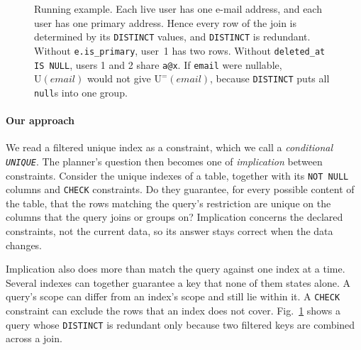 \documentclass[conference]{IEEEtran}
\theoremstyle{definition}
\newcommand{\sql}[1]{\texttt{#1}}
\newcommand{\nul}{\texttt{null}}
\newcommand{\U}[1]{\mathrm{U}(#1)}
\newcommand{\Ueq}[1]{\mathrm{U}^{=}(#1)}
\begin{document}
\begin{figure}[t]
\smallskip
{}
\caption{Running example. Each live user has one e-mail address, and each user has one primary address. Hence every
row of the join is determined by its \sql{DISTINCT} values, and \sql{DISTINCT} is redundant. Without \sql{e.is\_primary},
user~1 has two rows. Without \sql{deleted\_at IS NULL}, users 1 and 2 share \sql{a@x}. If \sql{email} were nullable,
$\U{\mathit{email}}$ would not give $\Ueq{\mathit{email}}$, because \sql{DISTINCT} puts all \nul s into one group.}
\label{fig:example}
\end{figure}

\paragraph*{Our approach} We read a filtered unique index as a constraint, which we call a \emph{conditional
\sql{UNIQUE}}. The planner's question then becomes one of \emph{implication} between constraints. Consider the unique
indexes of a table, together with its \sql{NOT NULL} columns and \sql{CHECK} constraints. Do they guarantee, for every
possible content of the table, that the rows matching the query's restriction are unique on the columns that the
query joins or groups on? Implication concerns the declared constraints, not the current data, so its answer stays
correct when the data changes.

Implication also does more than match the query against one index at a time. Several indexes can together guarantee
a key that none of them states alone. A query's scope can differ from an index's scope and still lie within it. A
\sql{CHECK} constraint can exclude the rows that an index does not cover. Fig.~\ref{fig:example} shows a query whose
\sql{DISTINCT} is redundant only because two filtered keys are combined across a join.
\end{document}

